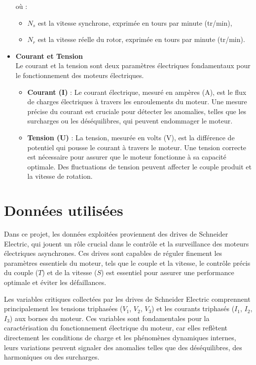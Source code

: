 \begin{itemize}
        où :
        \begin{itemize}
          \item \(N_s\) est la vitesse synchrone, exprimée en tours par minute (tr/min),
          \item \(N_r\) est la vitesse réelle du rotor, exprimée en tours par minute (tr/min).
        \end{itemize}

  \item \textbf{Courant et Tension} \\
        Le courant et la tension sont deux paramètres électriques fondamentaux pour le fonctionnement des moteurs électriques.
        \begin{itemize}
          \item \textbf{Courant (I)} : Le courant électrique, mesuré en ampères (A), est le flux de charges électriques à travers les enroulements du moteur. Une mesure précise du courant est cruciale pour détecter les anomalies, telles que les surcharges ou les déséquilibres, qui peuvent endommager le moteur.
          \item \textbf{Tension (U)} : La tension, mesurée en volts (V), est la différence de potentiel qui pousse le courant à travers le moteur. Une tension correcte est nécessaire pour assurer que le moteur fonctionne à sa capacité optimale. Des fluctuations de tension peuvent affecter le couple produit et la vitesse de rotation.
        \end{itemize}

\end{itemize}

\section{Données utilisées }

Dans ce projet, les données exploitées proviennent des drives de Schneider
Electric, qui jouent un rôle crucial dans le contrôle et la surveillance des
moteurs électriques asynchrones. Ces drives sont capables de réguler finement
les paramètres essentiels du moteur, tels que le couple et la vitesse, le
contrôle précis du couple (\(T\)) et de la vitesse (\(S\)) est essentiel pour
assurer une performance optimale et éviter les défaillances.

Les variables critiques collectées par les drives de Schneider Electric
comprennent principalement les tensions triphasées (\(V_1\), \(V_2\), \(V_3\))
et les courants triphasés (\(I_1\), \(I_2\), \(I_3\)) aux bornes du moteur. Ces
variables sont fondamentales pour la caractérisation du fonctionnement
électrique du moteur, car elles reflètent directement les conditions de charge
et les phénomènes dynamiques internes, leurs variations peuvent signaler des
anomalies telles que des déséquilibres, des harmoniques ou des surcharges.

